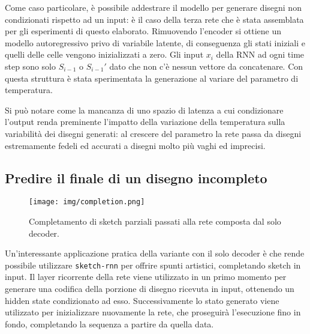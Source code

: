 Come caso particolare, è possibile addestrare il modello per generare disegni non condizionati rispetto ad un input: è il caso della terza rete che è stata assemblata per gli esperimenti di questo elaborato. Rimuovendo l'encoder si ottiene un modello autoregressivo privo di variabile latente, di conseguenza gli stati iniziali e quelli delle celle vengono inizializzati a zero. Gli input $x_i$ della RNN ad ogni time step sono solo $S_{i-1}$ o $S_{i-1}'$ dato che non c'è nessun vettore da concatenare. Con questa struttura è stata sperimentata la generazione al variare del parametro di temperatura.

Si può notare come la mancanza di uno spazio di latenza a cui condizionare l'output renda preminente l'impatto della variazione della temperatura sulla variabilità dei disegni generati: al crescere del parametro la rete passa da disegni estremamente fedeli ed accurati a disegni molto più vaghi ed imprecisi.

\subsection{Predire il finale di un disegno incompleto} %
\label{sub:predire_il_finale_di_un_disegno_incompleto}
\begin{figure}
	\centering
	\texttt{[image: img/completion.png]}
	\caption{Completamento di sketch parziali passati alla rete composta dal solo decoder.}
	\label{fig:1.31}
\end{figure}

Un'interessante applicazione pratica della variante con il solo decoder è che rende possibile utilizzare \texttt{sketch-rnn} per offrire spunti artistici, completando sketch in input. Il layer ricorrente della rete viene utilizzato in un primo momento per generare una codifica della porzione di disegno ricevuta in input, ottenendo un hidden state condizionato ad esso. Successivamente lo stato generato viene utilizzato per inizializzare nuovamente la rete, che proseguirà l'esecuzione fino in fondo, completando la sequenza a partire da quella data.
